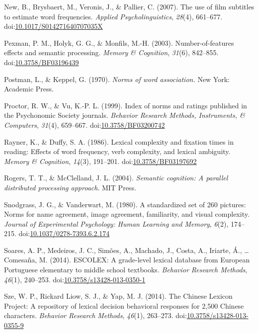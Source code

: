 \documentclass[english,,man]{apa6}
\theoremstyle{definition}
\theoremstyle{definition}
\theoremstyle{definition}
\theoremstyle{remark}
\begin{document}
\leavevmode\hypertarget{ref-New2007}{}%
New, B., Brysbaert, M., Veronis, J., \& Pallier, C. (2007). The use of
film subtitles to estimate word frequencies. \emph{Applied
Psycholinguistics}, \emph{28}(4), 661--677.
doi:\href{https://doi.org/10.1017/S014271640707035X}{10.1017/S014271640707035X}

\leavevmode\hypertarget{ref-Pexman2003}{}%
Pexman, P. M., Holyk, G. G., \& Monfils, M.-H. (2003).
Number-of-features effects and semantic processing. \emph{Memory \&
Cognition}, \emph{31}(6), 842--855.
doi:\href{https://doi.org/10.3758/BF03196439}{10.3758/BF03196439}

\leavevmode\hypertarget{ref-Postman1970}{}%
Postman, L., \& Keppel, G. (1970). \emph{Norms of word association.} New
York: Academic Press.

\leavevmode\hypertarget{ref-Proctor1999}{}%
Proctor, R. W., \& Vu, K.-P. L. (1999). Index of norms and ratings
published in the Psychonomic Society journals. \emph{Behavior Research
Methods, Instruments, \& Computers}, \emph{31}(4), 659--667.
doi:\href{https://doi.org/10.3758/BF03200742}{10.3758/BF03200742}

\leavevmode\hypertarget{ref-Rayner1986}{}%
Rayner, K., \& Duffy, S. A. (1986). Lexical complexity and fixation
times in reading: Effects of word frequency, verb complexity, and
lexical ambiguity. \emph{Memory \& Cognition}, \emph{14}(3), 191--201.
doi:\href{https://doi.org/10.3758/BF03197692}{10.3758/BF03197692}

\leavevmode\hypertarget{ref-Rogers2004}{}%
Rogers, T. T., \& McClelland, J. L. (2004). \emph{Semantic cognition: A
parallel distributed processing approach}. MIT Press.

\leavevmode\hypertarget{ref-Snodgrass1980}{}%
Snodgrass, J. G., \& Vanderwart, M. (1980). A standardized set of 260
pictures: Norms for name agreement, image agreement, familiarity, and
visual complexity. \emph{Journal of Experimental Psychology: Human
Learning and Memory}, \emph{6}(2), 174--215.
doi:\href{https://doi.org/10.1037/0278-7393.6.2.174}{10.1037/0278-7393.6.2.174}

\leavevmode\hypertarget{ref-Soares2014}{}%
Soares, A. P., Medeiros, J. C., Simões, A., Machado, J., Costa, A.,
Iriarte, Á., \ldots{} Comesaña, M. (2014). ESCOLEX: A grade-level
lexical database from European Portuguese elementary to middle school
textbooks. \emph{Behavior Research Methods}, \emph{46}(1), 240--253.
doi:\href{https://doi.org/10.3758/s13428-013-0350-1}{10.3758/s13428-013-0350-1}

\leavevmode\hypertarget{ref-Sze2014}{}%
Sze, W. P., Rickard Liow, S. J., \& Yap, M. J. (2014). The Chinese
Lexicon Project: A repository of lexical decision behavioral responses
for 2,500 Chinese characters. \emph{Behavior Research Methods},
\emph{46}(1), 263--273.
doi:\href{https://doi.org/10.3758/s13428-013-0355-9}{10.3758/s13428-013-0355-9}
\end{document}
